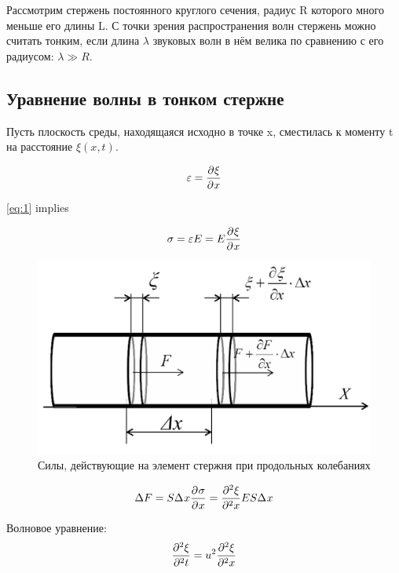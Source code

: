\documentclass[a4paper,12pt]{article}
\numberwithin{equation}{section}
\begin{document}
Рассмотрим стержень постоянного круглого сечения, радиус R которого много меньше его длины L. С точки зрения распространения волн стержень можно считать тонким, если длина $\lambda$ звуковых волн в нём велика по сравнению с его радиусом: $\lambda \gg R$.

\subsection{Уравнение волны в тонком стержне}
Пусть плоскость среды, находящаяся исходно в точке x,
сместилась к моменту t на расстояние $\xi(x,t)$.

\begin{equation}
  \varepsilon = \partderiv{\xi}{x}
  \label{eq:3}
\end{equation}

\eqref{eq:1} implies

\begin{equation}
  \sigma =  \varepsilon E = E \partderiv{\xi}{x}
  \label{eq:4}
\end{equation}

\begin{figure} [H] \center
  \includegraphics[scale=0.3]{data/pic1.png}
  \caption{Силы, действующие на элемент стержня при продольных колебаниях}
  \label{pic:1}
\end{figure}

\begin{equation}
  \Delta F = S \D{x} \partderiv{\sigma}{x} = 
  \partderiv[2]{\xi}{x} E S \D{x}
  \label{eq:5}
\end{equation}

Волновое уравнение:
\begin{equation}
  \partderiv[2]{\xi}{t} = u^2 \partderiv[2]{\xi}{x}
  \label{eq:6}
\end{equation}
\end{document}
